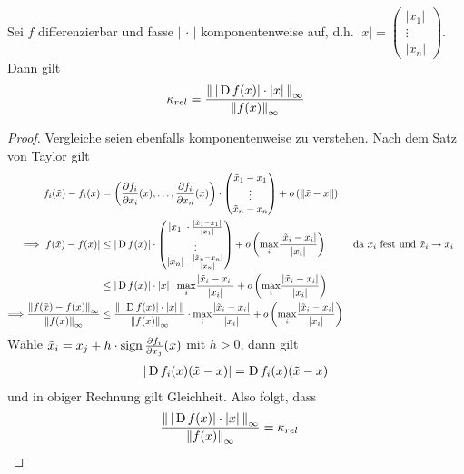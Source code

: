 \begin{Leme}
  \label{3.2.17}
  Sei $f$ differenzierbar und fasse $|\,\cdot\,|$ komponentenweise auf,
  d.h. $|x| = \begin{pmatrix}
    |x_1| \\
    \vdots \\
    |x_n|
  \end{pmatrix}$.
  Dann gilt
  \begin{gather}
    \kappa_{rel} = \frac{\nn[\,|\D f(x)|\cdot|x|\,]_\infty}{\nn[f(x)]_\infty}
    \label{III.2.16}
  \end{gather}
\end{Leme}

\begin{proof}
  Vergleiche seien ebenfalls komponentenweise zu verstehen.
  Nach dem Satz von Taylor gilt
 \begin{align*}
    f_i(\tilde{x})-f_i(x) 
     &= \left( 
       \frac{\partial f_i}{\partial x_i}(x),
       \dotsc ,\frac{\partial f_i}{\partial x_n}(x) 
       \right)
       \cdot \begin{pmatrix}
         \tilde{x}_1-x_1 \\
         \vdots \\
         \tilde{x}_n-x_n
       \end{pmatrix}
     + o\left(\nn[\tilde{x}-x]\right) \\
   \Longrightarrow 
   |f(\tilde{x})-f(x)|
     &\leq |\D f(x)|
       \cdot \begin{pmatrix}
       |x_1|\cdot \frac{|\tilde{x}_1-x_1|}{|x_1|}\\
       \vdots \\
       |x_n|\cdot \frac{|\tilde{x}_n-x_n|}{|x_n|}
       \end{pmatrix}
   + o\left(
   \underset{i}{\max} \frac{|\tilde{x}_i-x_i|}{|x_i|}
   \right)
     && \text{da $x_i$ fest und $\tilde{x}_i\to x_i$} \\
     &\leq |\D f(x)| \cdot |x| 
       \cdot \underset{i}{\max} \frac{|\tilde{x}_i-x_i|}{|x_i|}
       + o\left(
       \underset{i}{\max} \frac{|\tilde{x}_i-x_i|}{|x_i|}
       \right) \\
   \Longrightarrow \frac{\nn[f(\tilde{x})-f(x)]_\infty}{\nn[f(x)]_\infty}
     &\leq  \frac{\nn[\,|\D f(x)|\cdot |x| \,]}{\nn[f(x)]_\infty}
       \cdot \underset{i}{\max}\frac{|\tilde{x}_i-x_i|}{|x_i|}
       + o\left( 
       \underset{i}{\max} \frac{|\tilde{x}_i-x_i|}{|x_i|} 
       \right)
 \end{align*}
  Wähle $\tilde{x}_i = x_j+h\cdot \Sign \frac{\partial f_i}{\partial x_j}(x)$ mit $h>0$,
  dann gilt
  \begin{gather*}
    |\D f_i(x)(\tilde{x}-x)| = \D f_i(x)(\tilde{x}-x)
  \end{gather*}
  und in obiger Rechnung gilt Gleichheit.
  Also folgt, dass
  \begin{align*}
    \frac{\nn[\,|\D f(x)|\cdot |x| \, ]_\infty}{\nn[f(x)]_\infty} &= \kappa_{rel} 
  \end{align*}
\end{proof}


